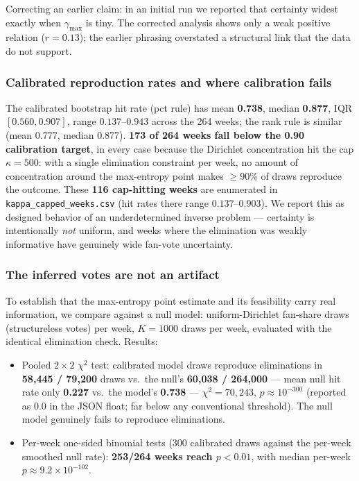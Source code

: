 \documentclass[11pt]{article}
\begin{document}
Correcting an earlier claim: in an initial run we reported that certainty widest exactly
when $\gamma_{\max}$ is tiny. The corrected analysis shows only a weak positive relation
($r=0.13$); the earlier phrasing overstated a structural link that the data do not
support.

\subsubsection{Calibrated reproduction rates and where calibration fails}

The calibrated bootstrap hit rate (pct rule) has mean \textbf{0.738}, median \textbf{0.877},
IQR $[0.560, 0.907]$, range $0.137$--$0.943$ across the 264 weeks; the rank rule is
similar (mean 0.777, median 0.877). \textbf{173 of 264 weeks fall below the 0.90
calibration target}, in every case because the Dirichlet concentration hit the cap
$\kappa = 500$: with a single elimination constraint per week, no amount of concentration
around the max-entropy point makes $\ge 90\%$ of draws reproduce the outcome. These
\textbf{116 cap-hitting weeks} are enumerated in \texttt{kappa\_capped\_weeks.csv}
(hit rates there range $0.137$--$0.903$). We report this as designed behavior of an
underdetermined inverse problem --- certainty is intentionally \emph{not} uniform, and
weeks where the elimination was weakly informative have genuinely wide fan-vote
uncertainty.

\subsubsection{The inferred votes are not an artifact}

To establish that the max-entropy point estimate and its feasibility carry real
information, we compare against a null model: uniform-Dirichlet fan-share draws
(structureless votes) per week, $K=1000$ draws per week, evaluated with the identical
elimination check. Results:
\begin{itemize}[itemsep=1pt]
  \item Pooled $2\times2$ $\chi^2$ test: calibrated model draws reproduce eliminations in
        \textbf{58{,}445 / 79{,}200} draws vs.\ the null's \textbf{60{,}038 / 264{,}000}
        --- mean null hit rate only \textbf{0.227} vs.\ the model's \textbf{0.738} ---
        $\chi^2 = 70{,}243$, $p \approx 10^{-300}$ (reported as 0.0 in the JSON float;
        far below any conventional threshold). The null model genuinely fails to
        reproduce eliminations.
  \item Per-week one-sided binomial tests (300 calibrated draws against the per-week
        smoothed null rate): \textbf{253/264 weeks reach $p < 0.01$}, with median
        per-week $p \approx 9.2 \times 10^{-102}$.
\end{itemize}
\end{document}
